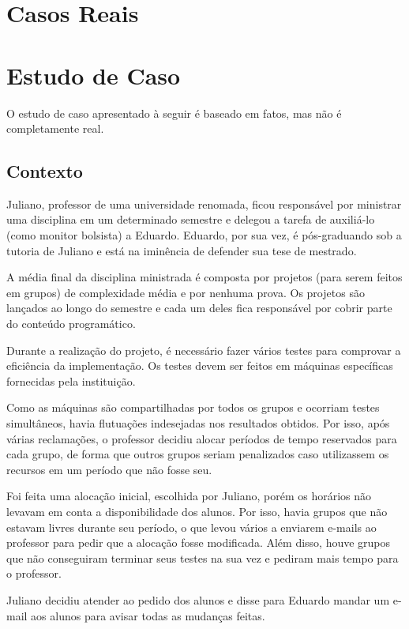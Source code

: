 \documentclass[a4paper,dvipdfm]{article}
\begin{document}
\newpage
\section{Casos Reais}

\newpage
\section{Estudo de Caso}
	O estudo de caso apresentado à seguir é baseado em fatos, mas não é completamente real. 

	\subsection{Contexto}	
    Juliano, professor de uma universidade renomada, ficou responsável por ministrar uma disciplina em um determinado semestre e delegou a tarefa de auxiliá-lo (como monitor bolsista) a Eduardo. 
	Eduardo, por sua vez, é pós-graduando sob a tutoria de Juliano e está na iminência de defender sua tese de mestrado.

    A média final da disciplina ministrada é composta por projetos (para serem feitos em grupos) de complexidade média e por nenhuma prova.
	Os projetos são lançados ao longo do semestre e cada um deles fica responsável por cobrir parte do conteúdo programático.

	Durante a realização do projeto, é necessário fazer vários testes para comprovar a eficiência da implementação. 
	Os testes devem ser feitos em máquinas específicas fornecidas pela instituição.
	
	Como as máquinas são compartilhadas por todos os grupos e ocorriam testes simultâneos, havia flutuações indesejadas nos resultados obtidos.
	Por isso, após várias reclamações, o professor decidiu alocar períodos de tempo reservados para cada grupo, de forma que outros grupos seriam penalizados caso utilizassem os recursos em um período que não fosse seu.

	Foi feita uma alocação inicial, escolhida por Juliano, porém os horários não levavam em conta a disponibilidade dos alunos. 
	Por isso, havia grupos que não estavam livres durante seu período, o que levou vários a enviarem e-mails ao professor para pedir que a alocação fosse modificada.
	Além disso, houve grupos que não conseguiram terminar seus testes na sua vez e pediram mais tempo para o professor.

	Juliano decidiu atender ao pedido dos alunos e disse para Eduardo mandar um e-mail aos alunos para avisar todas as mudanças feitas.
	
\end{document}

